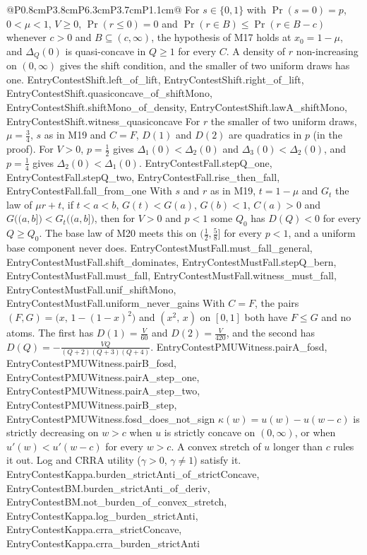 \begin{longtable}{@{}P{0.8cm}P{3.8cm}P{6.3cm}P{3.7cm}P{1.1cm}@{}}
  {For $s\in\{0,1\}$ with $\Pr(s=0)=p$, $0<\mu<1$, $V\ge0$, $\Pr(r\le0)=0$ and
  $\Pr(r\in B)\le\Pr(r\in B-c)$ whenever $c>0$ and $B\subseteq(c,\infty)$, the
  hypothesis of M17 holds at $x_0=1-\mu$, and $\Delta_Q(0)$ is quasi-concave in
  $Q\ge1$ for every $C$. A density of $r$ non-increasing on $(0,\infty)$ gives
  the shift condition, and the smaller of two uniform draws has one.}
  {EntryContestShift.left_of_lift, EntryContestShift.right_of_lift, EntryContestShift.quasiconcave_of_shiftMono, EntryContestShift.shiftMono_of_density, EntryContestShift.lawA_shiftMono, EntryContestShift.witness_quasiconcave}
  {For $r$ the smaller of two uniform draws, $\mu=\frac34$, $s$ as in M19 and
  $C=F$, $D(1)$ and $D(2)$ are quadratics in $p$ (in the proof). For $V>0$,
  $p=\frac12$ gives $\Delta_1(0)<\Delta_2(0)$ and $\Delta_3(0)<\Delta_2(0)$, and
  $p=\frac14$ gives $\Delta_2(0)<\Delta_1(0)$.}
  {EntryContestFall.stepQ_one, EntryContestFall.stepQ_two, EntryContestFall.rise_then_fall, EntryContestFall.fall_from_one}
  {With $s$ and $r$ as in M19, $t=1-\mu$ and $G_t$ the law of $\mu r+t$, if
  $t<a<b$, $G(t)<G(a)$, $G(b)<1$, $C(a)>0$ and $G\big((a,b]\big)<G_t\big((a,b]\big)$,
  then for $V>0$ and $p<1$ some $Q_0$ has $D(Q)<0$ for every $Q\ge Q_0$. The base
  law of M20 meets this on $(\frac12,\frac58]$ for every $p<1$, and a uniform
  base component never does.}
  {EntryContestMustFall.must_fall_general, EntryContestMustFall.shift_dominates, EntryContestMustFall.stepQ_bern, EntryContestMustFall.must_fall, EntryContestMustFall.witness_must_fall, EntryContestMustFall.unif_shiftMono, EntryContestMustFall.uniform_never_gains}
  {With $C=F$, the pairs $(F,G)=\big(x,\,1-(1-x)^2\big)$ and $(x^2,\,x)$ on
  $[0,1]$ both have $F\le G$ and no atoms. The first has $D(1)=\frac V{60}$ and
  $D(2)=\frac V{420}$, and the second has $D(Q)=-\frac{VQ}{(Q+2)(Q+3)(Q+4)}$.}
  {EntryContestPMUWitness.pairA_fosd, EntryContestPMUWitness.pairB_fosd, EntryContestPMUWitness.pairA_step_one, EntryContestPMUWitness.pairA_step_two, EntryContestPMUWitness.pairB_step, EntryContestPMUWitness.fosd_does_not_sign}
  {$\kappa(w)=u(w)-u(w-c)$ is strictly decreasing on $w>c$ when $u$ is strictly
  concave on $(0,\infty)$, or when $u'(w)<u'(w-c)$ for every $w>c$. A convex
  stretch of $u$ longer than $c$ rules it out. Log and CRRA utility ($\gamma>0$,
  $\gamma\ne1$) satisfy it.}
  {EntryContestKappa.burden_strictAnti_of_strictConcave, EntryContestBM.burden_strictAnti_of_deriv, EntryContestBM.not_burden_of_convex_stretch, EntryContestKappa.log_burden_strictAnti, EntryContestKappa.crra_strictConcave, EntryContestKappa.crra_burden_strictAnti}

\end{longtable}
